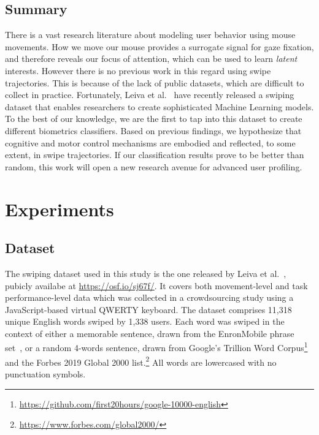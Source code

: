 \documentclass[11pt,oneside,a4paper,openright]{book}
\begin{document}
\section{Summary}

There is a vast research literature about modeling user behavior using mouse movements.
How we move our mouse provides a surrogate signal for gaze fixation,
and therefore reveals our focus of attention,
which can be used to learn \emph{latent} interests.
However there is no previous work in this regard using swipe trajectories.
This is because of the lack of public datasets, which are difficult to collect in practice.
Fortunately, Leiva et al.~\cite{Leiva21_swipe} have recently released a swiping dataset
that enables researchers to create sophisticated Machine Learning models.
To the best of our knowledge, we are the first to tap into this dataset
to create different biometrics classifiers.
Based on previous findings,
we hypothesize that cognitive and motor control mechanisms are embodied
and reflected, to some extent, in swipe trajectories.
If our classification results prove to be better than random,
this work will open a new research avenue for advanced user profiling.



\chapter{Experiments }

\section{Dataset}

The swiping dataset used in this study is the one released by Leiva et al.~\cite{Leiva21_swipe}, pubicly availabe at \url{https://osf.io/sj67f/}.
It covers both movement-level and task performance-level data which was collected in a crowdsourcing study using a JavaScript-based virtual QWERTY keyboard.
The dataset comprises 11,318 unique English words swiped by 1,338 users.
Each word was swiped in the context of either a memorable sentence,
drawn from the EnronMobile phrase set~\cite{Vertanen11_enron},
or a random 4-words sentence, drawn from Google's Trillion Word Corpus\footnote{\url{https://github.com/first20hours/google-10000-english}}
and the Forbes 2019 Global 2000 list.\footnote{\url{https://www.forbes.com/global2000/}}
All words are lowercased with no punctuation symbols.\\
\end{document}
